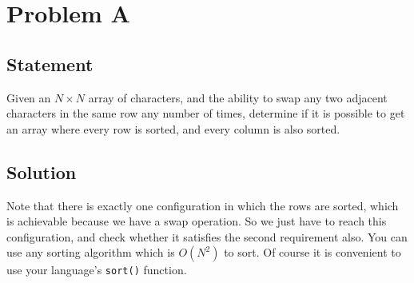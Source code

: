 \section{Problem A}
	\subsection{Statement}
		Given an $N \times N$ array of characters, and the ability to swap any two adjacent characters 
		in the same row any number of times, determine if it is possible to get an array
		where every row is sorted, and every column is also sorted.

	\subsection{Solution}
		Note that there is exactly one configuration in which the rows are sorted, which is achievable
		because we have a swap operation. So we just have to reach this configuration, and check whether 
		it satisfies the second requirement also.
		You can use any sorting algorithm which is $O(N^2)$ to sort.
		Of course it is convenient to use your language's \verb|sort()| function.